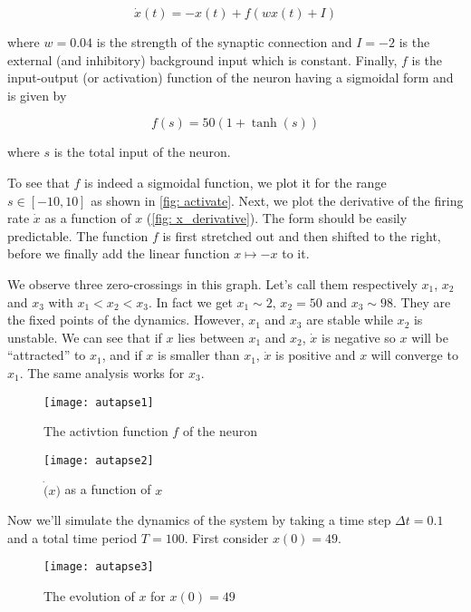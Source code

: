 \[\dot{x}(t) = -x(t) + f(wx(t)+I)\]

\noindent
where $w = 0.04$ is the strength of the synaptic connection and $I = -2$ 
is the external (and inhibitory) background input which is constant.
Finally, $f$ is the input-output (or activation) function of the neuron having
a sigmoidal form and is given by

\[f(s) = 50(1 + \tanh(s))\]

\noindent
where $s$ is the total input of the neuron.

To see that $f$ is indeed a sigmoidal function, we plot it for the range 
$s \in [-10, 10]$ as shown in \autoref{fig: activate}. Next, we plot the
derivative of the firing rate $\dot{x}$ as a function of $x$ 
(\autoref{fig: x_derivative}). The form should be easily predictable.
The function $f$ is first stretched out and then shifted to the right,
before we finally add the linear function $x \mapsto -x$ to it.

We observe three zero-crossings in this graph. Let's call them respectively
$x_1$, $x_2$ and $x_3$ with $x_1 < x_2 < x_3$. In fact we get $x_1 \sim 2$,
$x_2 = 50$ and $x_3 \sim 98$. They are the fixed points of the dynamics.
However, $x_1$ and $x_3$ are stable while $x_2$ is unstable.
We can see that if $x$ lies between $x_1$ and $x_2$, $\dot{x}$ is negative
so $x$ will be ``attracted'' to $x_1$, and if $x$ is smaller than $x_1$,
$\dot{x}$ is positive and $x$ will converge to $x_1$. The same analysis
works for $x_3$.

\newpage

\vspace{-1em}
\begin{figure}[H]
  \centering
  \texttt{[image: autapse1]}
  \caption{The activtion function $f$ of the neuron}
  \label{fig: activate}
\end{figure}

\vspace{-1em}
\begin{figure}[H]
  \centering
  \texttt{[image: autapse2]}
  \caption{$\dot(x)$ as a function of $x$}
  \label{fig: x_derivative}
\end{figure}

Now we'll simulate the dynamics of the system by taking a time step 
$\Delta t = 0.1$ and a total time period $T = 100$. First consider
$x(0) = 49$.

\vspace{-1em}
\begin{figure}[H]
  \centering
  \texttt{[image: autapse3]}
  \caption{The evolution of $x$ for $x(0) = 49$}
\end{figure}

